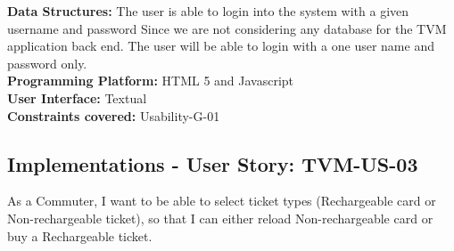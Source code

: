 \documentclass[a4paper,12pt]{report}
\begin{document}
\begin{flushleft}
	\vspace{0.5cm}
	\textbf{Data Structures: }The user is able to login into the system with a given username and password  Since we are not considering any database for the TVM application back end. The user will be able to login with a one user name and password only.\\
	
	\vspace{0.5cm}
	\textbf{Programming Platform: } HTML 5 and Javascript \\
	\textbf{User Interface:} Textual \\
	\textbf{Constraints covered:} Usability-G-01 \\
	
\end{flushleft}



\vspace{0.5cm}
\FloatBarrier
\subsection{Implementations - User Story: TVM-US-03}
As a Commuter, I want to be able to select ticket types (Rechargeable card or Non-rechargeable ticket), so that I can either reload Non-rechargeable card or buy a Rechargeable ticket.
\end{document}
